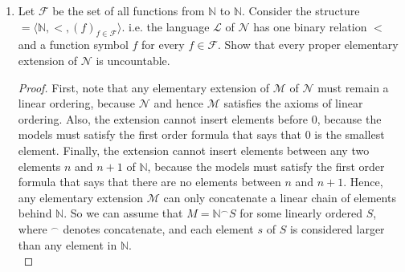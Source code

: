\documentclass{article}
\begin{document}
\begin{enumerate}[label={\bf Q\arabic*:}]
\begin{enumerate}
\begin{proof}
          We claim that $|\overline{\mathcal{S}}|=2^{\omega}$. Clearly
          $|\overline{\mathcal{S}}|\leq2^{\omega}$ since
          $|\mathbb{N}^{\mathbb{N}}|=2^{\omega}$. Assume by contradiction
          that $\overline{\mathcal{S}}$ is countable, and let
          $\{f_n:n\in\mathbb{N}\}$ enumerate $\overline{\mathcal{S}}$. We
          apply Cantor's diagonalization to construct a function $f$ not in
          $\overline{\mathcal{S}}$ that is almost disjoint with all the
          functions in $\overline{\mathcal{S}}$, contradicting the
          maximality of $\overline{\mathcal{S}}$: For each
          $n\in\mathbb{N}$, let
          \begin{equation*}
            f(n) := \max(f_0(n),\ldots,f_n(n))+1.
          \end{equation*}
          Then $f$ will agree with each $f_n$ at a maximum of only the
          first $n$ points.
        \end{proof}

      \item Let $\mathcal{F}$ be the set of all functions from $\mathbb{N}$
        to $\mathbb{N}$. Consider the structure
        $\mathcal=\langle\mathbb{N},<,(f)_{f\in\mathcal{F}}\rangle$. i.e. the
        language $\mathcal{L}$ of $\mathcal{N}$ has one binary relation $<$
        and a function symbol $f$ for every $f\in\mathcal{F}$. Show that
        every proper elementary extension of $\mathcal{N}$ is uncountable.

        \begin{proof}
          First, note that any elementary extension of $\mathcal{M}$ of
          $\mathcal{N}$ must remain a linear ordering, because
          $\mathcal{N}$ and hence $\mathcal{M}$ satisfies the axioms of
          linear ordering. Also, the extension cannot insert elements
          before $0$, because the models must satisfy the first order
          formula that says that $0$ is the smallest element. Finally, the
          extension cannot insert elements between any two elements $n$ and
          $n+1$ of $\mathbb{N}$, because the models must satisfy the first
          order formula that says that there are no elements between $n$
          and $n+1$. Hence, any elementary extension $\mathcal{M}$ can only
          concatenate a linear chain of elements behind $\mathbb{N}$. So we
          can assume that $M=\mathbb{N}^\frown S$ for some linearly ordered
          $S$, where $^\frown$ denotes concatenate, and each element $s$ of
          $S$ is considered larger than any element in $\mathbb{N}$. \\


\end{proof}
\end{enumerate}
\end{enumerate}
\end{document}
